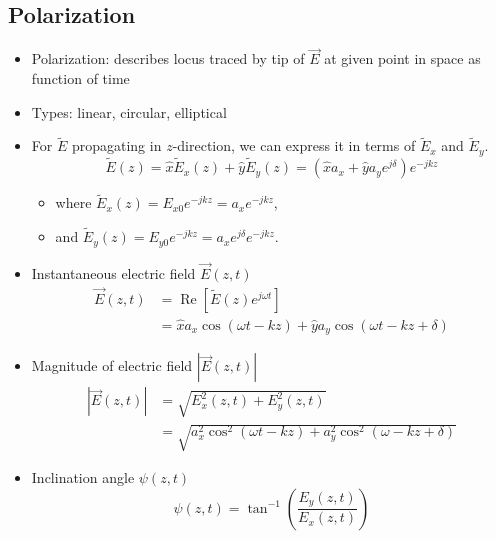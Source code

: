\documentclass[a4paper]{article}
\begin{document}
\subsection{Polarization}
\begin{itemize}
    \item Polarization: describes locus traced by tip of $\overrightarrow{E}$ at given point in space as function of time
    \item Types: linear, circular, elliptical
    \bigskip
    \item For $\widetilde{E}$ propagating in $z$-direction, we can express it in terms of $\widetilde{E}_x$ and $\widetilde{E}_y$.
    $$\widetilde{E}(z) = \hat{x}\widetilde{E}_x(z)+\hat{y}\widetilde{E}_y(z) = (\hat{x}a_x+\hat{y}a_ye^{j\delta})e^{-jkz}$$
    \begin{itemize}[label=$\circ$]
        \item where $\widetilde{E}_x(z) = E_{x0}e^{-jkz} = a_xe^{-jkz}$,
        \item and $\widetilde{E}_y(z) = E_{y0}e^{-jkz} = a_xe^{j\delta}e^{-jkz}$.
    \end{itemize}
    \item Instantaneous electric field $\overrightarrow{E}(z, t)$
    \begin{align*}
        \overrightarrow{E}(z, t) &= \operatorname{Re}\left[\widetilde{E}(z)e^{j\omega t}\right]\\
        &= \hat{x}a_x\cos(\omega t-kz)+\hat{y}a_y\cos(\omega t-kz+\delta)
    \end{align*}
    \item Magnitude of electric field $|\overrightarrow{E}(z, t)|$
    \begin{align*}
        |\overrightarrow{E}(z, t)| &= \sqrt{E_x^2(z, t)+E_y^2(z, t)}\\
        &= \sqrt{a_x^2\cos^2(\omega t-kz)+a_y^2\cos^2(\omega-kz+\delta)}
    \end{align*}
    \item Inclination angle $\psi(z, t)$
    $$\psi(z, t) = \tan^{-1}\left(\frac{E_y(z, t)}{E_x(z, t)}\right)$$
\end{itemize}
\end{document}
